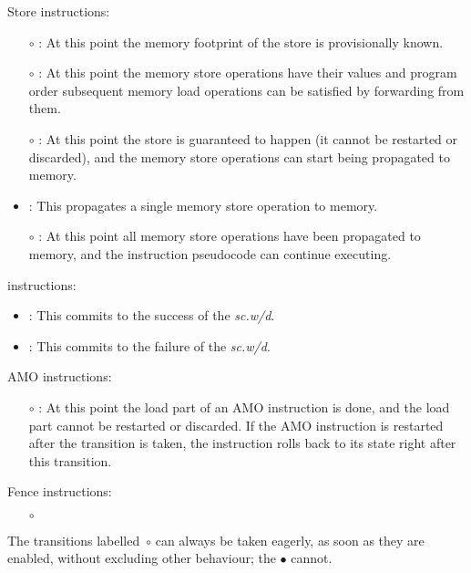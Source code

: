 \noindent Store instructions:
\begin{itemize}
\item[$\circ$] : At this point the memory footprint of the store is provisionally known.
\item[$\circ$] : At this point the memory store operations have their values and program order subsequent memory load operations can be satisfied by forwarding from them.
\item[$\circ$] : At this point the store is guaranteed to happen (it cannot be restarted or discarded), and the memory store operations can start being propagated to memory.
\item {}: This propagates a single memory store operation to memory.
\item[$\circ$] : At this point all memory store operations have been propagated to memory, and the instruction pseudocode can continue executing.
\end{itemize}

 instructions:
\begin{itemize}
\item {}: This commits to the success of the {\em sc.w/d}.
\item {}: This commits to the failure of the {\em sc.w/d}.
\end{itemize}

\noindent AMO instructions:
\begin{itemize}
\item[$\circ$] : At this point the load part of an AMO instruction is done, and the load part cannot be restarted or discarded. If the AMO instruction is restarted after the transition is taken, the instruction rolls back to its state right after this transition.
\end{itemize}

\noindent Fence instructions:
\begin{itemize}
\item[$\circ$] 
\end{itemize}

\begin{commentary}
The transitions labelled~$\circ$ can always be taken eagerly, as soon as they are enabled, without excluding other behaviour; the $\bullet$ cannot.
\end{commentary}

